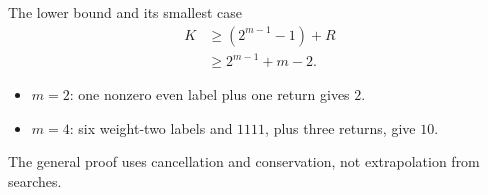 \documentclass{beamer}
\begin{document}
\begin{frame}{The lower bound and its smallest case}
\[\begin{aligned}
K&\geq(2^{m-1}-1)+R\\
 &\geq2^{m-1}+m-2.
\end{aligned}\]
\begin{itemize}
\item $m=2$: one nonzero even label plus one return gives $2$.
\item $m=4$: six weight-two labels and $1111$, plus three returns, give $10$.
\end{itemize}
The general proof uses cancellation and conservation, not extrapolation from searches.
\end{frame}
\end{document}
